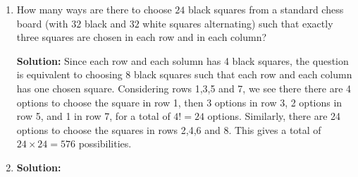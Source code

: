 \documentclass{article}
\begin{document}
\begin{enumerate}[1.]
\item %
How many ways are there to choose $24$ black squares from a standard chess board (with $32$ black and $32$ white squares alternating) such that exactly three squares are chosen in each row and in each column?

\textbf{Solution:} Since each row and each solumn has 4 black squares, the question is equivalent to choosing 8 black squares such that each row and each column has one chosen square. Considering rows 1,3,5 and 7, we see there there are 4 options to choose the square in row 1, then 3 options in row 3, 2 options in row 5, and 1 in row 7, for a total of $4! = 24$ options. Similarly, there are 24 options to choose the squares in rows 2,4,6 and 8. This gives a total of $24\times24 = 576$ possibilities.

\item %

\textbf{Solution:}

\end{enumerate}
\end{document}
